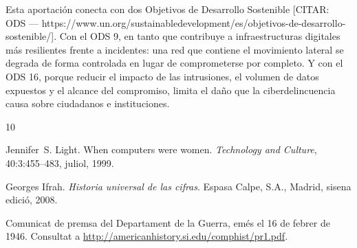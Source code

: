 \documentclass[11pt,spanish,listoffigures,listoftables]{tfgetsinf}
\begin{document}
        Esta aportación conecta con dos Objetivos de Desarrollo Sostenible [CITAR: ODS — https://www.un.org/sustainabledevelopment/es/objetivos-de-desarrollo-sostenible/]. Con el ODS 9, en tanto que contribuye a infraestructuras digitales más resilientes frente a incidentes: una red que contiene el movimiento lateral se degrada de forma controlada en lugar de comprometerse por completo. Y con el ODS 16, porque reducir el impacto de las intrusiones, el volumen de datos expuestos y el alcance del compromiso, limita el daño que la ciberdelincuencia causa sobre ciudadanos e instituciones.


\begin{thebibliography}{10}

   Jennifer~S. Light.
   \newblock When computers were women.
   \newblock \textit{Technology and Culture}, 40:3:455--483, juliol, 1999.

   Georges Ifrah.
   \newblock \textit{Historia universal de las cifras}.
   \newblock Espasa Calpe, S.A., Madrid, sisena edició, 2008.

   Comunicat de premsa del Departament de la Guerra, 
   emés el 16 de febrer de 1946. 
   \newblock Consultat a 
   \url{http://americanhistory.si.edu/comphist/pr1.pdf}.

\end{thebibliography}
\cleardoublepage

\end{document}
